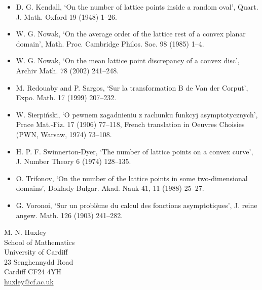 \documentclass[10pt]{article}
\begin{document}
\begin{itemize}
  \item[15.] D. G. Kendall, `On the number of lattice points inside a random oval', Quart. J. Math. Oxford 19 (1948) 1--26.
  \item[16.] W. G. Nowak, `On the average order of the lattice rest of a convex planar domain', Math. Proc. Cambridge Philos. Soc. 98 (1985) 1--4.
  \item[17.] W. G. Nowak, `On the mean lattice point discrepancy of a convex disc', Archiv Math. 78 (2002) 241--248.
  \item[18.] M. Redouaby and P. Sargos, `Sur la transformation B de Van der Corput', Expo. Math. 17 (1999) 207--232.
  \item[19.] W. Sierpiński, `O pewnem zagadnieniu z rachunku funkcyj asymptotycznych', Prace Mat.-Fiz. 17 (1906) 77--118, French translation in Oeuvres Choisies (PWN, Warsaw, 1974) 73--108.
  \item[20.] H. P. F. Swinnerton-Dyer, `The number of lattice points on a convex curve', J. Number Theory 6 (1974) 128--135.
  \item[21.] O. Trifonov, `On the number of the lattice points in some two-dimensional domains', Doklady Bulgar. Akad. Nauk 41, 11 (1988) 25--27.
  \item[22.] G. Voronoi, `Sur un problème du calcul des fonctions asymptotiques', J. reine angew. Math. 126 (1903) 241--282.
\end{itemize}

M. N. Huxley\\
School of Mathematics\\
University of Cardiff\\
23 Senghennydd Road\\
Cardiff CF24 4YH\\
\href{mailto:huxley@cf.ac.uk}{huxley@cf.ac.uk}
\end{document}
